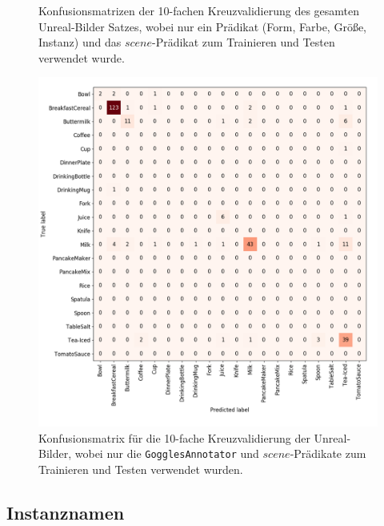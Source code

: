 \begin{figure}
\begin{subfigure}[b]{0.48\textwidth}
	\end{subfigure}
\caption[Konfusionsmatrizen für die Klassifikation mit nur einem Annotatoren Prädikat]{Konfusionsmatrizen der 10-fachen Kreuzvalidierung des gesamten Unreal-Bilder Satzes, wobei nur ein \robosherlock Prädikat (Form, Farbe, Größe, Instanz) und das $scene$-Prädikat zum Trainieren und Testen verwendet wurde.}
\label{fig:singleEvidences}
\end{figure}

\begin{figure}
\centering
	\includegraphics[scale=.27]{img/chapter6/UnrealGTClass_goggles.png}	
\caption[Konfusionsmatrix für die Klassifikation nur durch den \texttt{GogglesAnnotator}]{Konfusionsmatrix für die 10-fache Kreuzvalidierung der Unreal-Bilder, wobei nur die \texttt{GogglesAnnotator} und $scene$-Prädikate zum Trainieren und Testen verwendet wurden.}
\label{fig:singleEvidencesGog}
\end{figure}

\subsection{Instanznamen}

